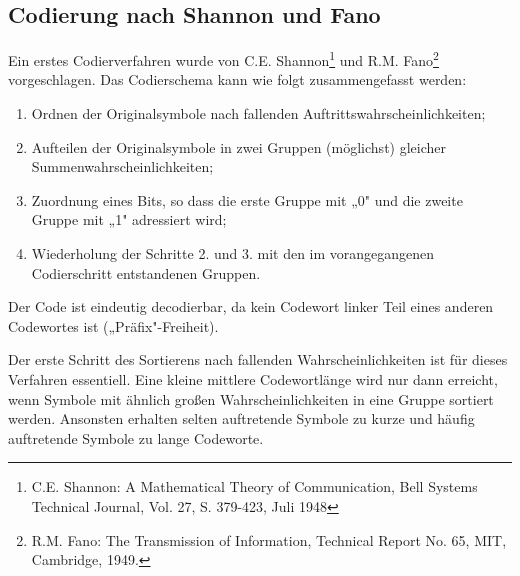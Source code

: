 \subsection{Codierung nach Shannon und Fano}
\label{sec:shannon-fano}

Ein erstes Codierverfahren wurde von C.E. Shannon\footnote{C.E. Shannon: A Mathematical Theory of Communication, Bell Systems Technical Journal, Vol. 27, S. 379-423, Juli 1948} und R.M. Fano\footnote{R.M. Fano: The Transmission of Information, Technical Report No. 65, MIT, Cambridge, 1949.} vorgeschlagen. Das Codierschema kann wie folgt zusammengefasst werden:

\begin{enumerate}
  \item Ordnen der Originalsymbole nach fallenden Auftrittswahrscheinlichkeiten;
  \item Aufteilen der Originalsymbole in zwei Gruppen (möglichst) gleicher Summenwahrscheinlichkeiten;
  \item Zuordnung eines Bits, so dass die erste Gruppe mit „0" und die zweite Gruppe mit „1" adressiert wird;
  \item Wiederholung der Schritte 2. und 3. mit den im vorangegangenen Codierschritt entstandenen Gruppen.
\end{enumerate}

Der Code ist eindeutig decodierbar, da kein Codewort linker Teil eines anderen Codewortes ist („Präfix"-Freiheit).

Der erste Schritt des Sortierens nach fallenden Wahrscheinlichkeiten ist für dieses Verfahren essentiell. Eine kleine mittlere Codewortlänge wird nur dann erreicht, wenn Symbole mit ähnlich großen Wahrscheinlichkeiten in eine Gruppe sortiert werden. Ansonsten erhalten selten auftretende Symbole zu kurze und häufig auftretende Symbole zu lange Codeworte.

